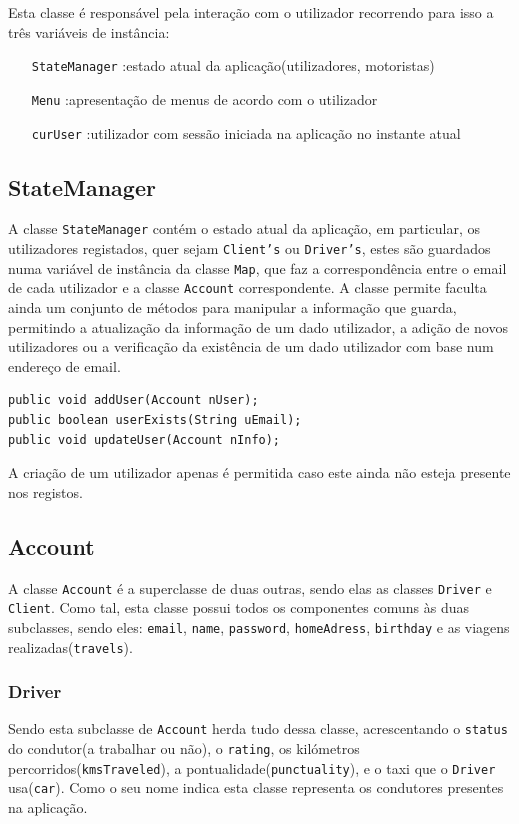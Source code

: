 \documentclass[a4paper,10pt,portuguese]{article}
\begin{document}
Esta classe é responsável pela interação com o utilizador recorrendo para isso a três variáveis de instância: 
\begin{itemize}
\item[\texttt{StateManager}] :estado atual da aplicação(utilizadores, motoristas)
\item[\texttt{Menu}] :apresentação de menus de acordo com o utilizador
\item[\texttt{curUser}] :utilizador com sessão iniciada na aplicação no instante atual 
\end{itemize}

\subsection{StateManager}
A classe \texttt{StateManager} contém o estado atual da aplicação, em particular, os utilizadores registados, quer sejam \texttt{Client's} ou \texttt{Driver's}, estes são guardados numa variável de instância da classe \texttt{Map}, que faz a correspondência entre o email de cada utilizador e a classe \texttt{Account} correspondente.
A classe permite faculta ainda um conjunto de métodos para manipular a informação que guarda, permitindo a atualização da informação de um dado utilizador, a adição de novos utilizadores ou a verificação da existência de um dado utilizador com base num endereço de email.
\begin{verbatim}
public void addUser(Account nUser);
public boolean userExists(String uEmail);
public void updateUser(Account nInfo); 
\end{verbatim}
A criação de um utilizador apenas é permitida caso este ainda não esteja presente nos registos.

\subsection{Account}
A classe \texttt{Account} é a superclasse de duas outras, sendo elas as classes \texttt{Driver} e \texttt{Client}. Como tal, esta classe possui todos os componentes comuns às duas subclasses, sendo eles: \texttt{email}, \texttt{name}, \texttt{password}, \texttt{homeAdress}, \texttt{birthday} e as viagens realizadas(\texttt{travels}).

\subsubsection{Driver}
Sendo esta subclasse de \texttt{Account} herda tudo dessa classe, acrescentando o \texttt{status} do condutor(a trabalhar ou não), o \texttt{rating}, os kilómetros percorridos(\texttt{kmsTraveled}), a pontualidade(\texttt{punctuality}), e o taxi que o \texttt{Driver} usa(\texttt{car}). Como o seu nome indica esta classe representa os condutores presentes na aplicação.
\end{document}
